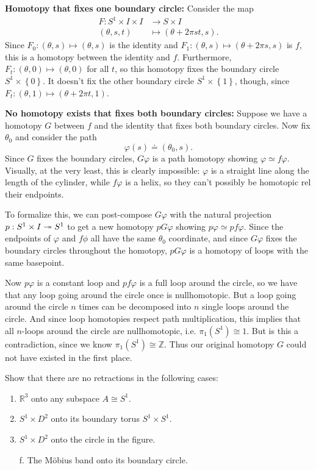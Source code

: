 \documentclass[twoside,10pt]{article}
\begin{document}
\textbf{Homotopy that fixes one boundary circle:} Consider the map
\begin{align*}
	F: S^{1} \times I \times I &\to S \times I \\
	(\theta,s,t) &\mapsto (\theta + 2\pi s t,s).
\end{align*}
Since $F_0: (\theta,s) \mapsto (\theta,s)$ is the identity and $F_1: (\theta,s) \mapsto (\theta+2\pi s,s)$ is $f$, this is a homotopy between the identity and $f$. Furthermore, $F_t: (\theta,0) \mapsto (\theta,0)$ for all $t$, so this homotopy fixes the boundary circle $S^{1}\times \left\{ 0 \right\}$. It doesn't fix the other boundary circle $S^{1}\times \left\{ 1 \right\}$, though, since $F_{t}:(\theta,1) \mapsto (\theta+2\pi t,1)$.

\textbf{No homotopy exists that fixes both boundary circles:} Suppose we have a homotopy $G$ between $f$ and the identity that fixes both boundary circles. Now fix $\theta_0$ and consider the path
\[
	\varphi(s) \doteq (\theta_0,s).
\] 
Since $G$ fixes the boundary circles, $G\varphi$ is a path homotopy showing $\varphi \simeq f \varphi$. Visually, at the very least, this is clearly impossible: $\varphi$ is a straight line along the length of the cylinder, while $f \varphi$ is a helix, so they can't possibly be homotopic rel their endpoints.

To formalize this, we can post-compose $G\varphi$ with the natural projection $p:S^{1}\times I \twoheadrightarrow S^{1}$ to get a new homotopy $pG\varphi$ showing $p\varphi \simeq p f \varphi$. Since the endpoints of $\varphi$ and $f\phi$ all have the same $\theta_0$ coordinate, and since $G\varphi$ fixes the boundary circles throughout the homotopy, $pG\varphi$ is a homotopy of loops with the same basepoint.

Now $p\varphi$ is a constant loop and $pf \varphi$ is a full loop around the circle, so we have that any loop going around the circle once is nullhomotopic. But a loop going around the circle $n$ times can be decomposed into $n$ single loops around the circle. And since loop homotopies respect path multiplication, this implies that all $n$-loops around the circle are nullhomotopic, i.e. $\pi_1(S^{1}) \cong 1$. But is this a contradiction, since we know $\pi_1(S^{1}) \cong \mathbb{Z}$. Thus our original homotopy $G$ could not have existed in the first place.

\newpage

\begin{exer}[1.1: 16 (a,b,c,f)]
	Show that there are no retractions in the following cases:
	\begin{enumerate}
		\item $\mathbb{R}^{3}$ onto any subspace $A \cong S^{1}$.
		\item $S^{1}\times D^{2}$ onto its boundary torus $S^{1}\times S^{1}$.
		\item $S^{1}\times D^{2}$ onto the circle in the figure.
		\item[f.] The M\"obius band onto its boundary circle.
	\end{enumerate}
\end{exer}
\end{document}
